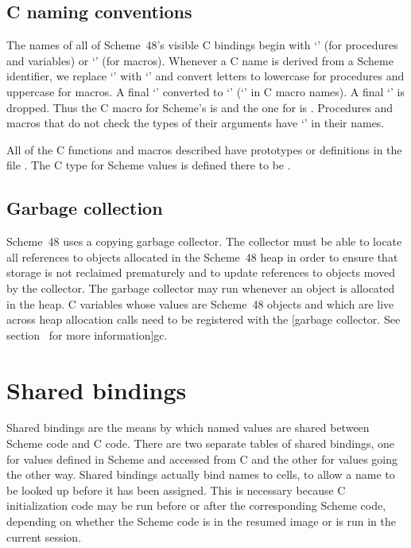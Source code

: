 \subsection{C naming conventions}

The names of all of Scheme~48's visible C bindings begin 
 with `' (for procedures and variables) or 
 `' (for macros).
Whenever a C name is derived from a Scheme identifier, we
 replace `\code{-}' with `\code{\_}' and convert letters to lowercase
 for procedures and uppercase for macros.
A final `'  converted to `' (`' in C macro names).
A final `\code{!}' is dropped.
Thus the C macro for Scheme's  is  and
 the one for  is .
Procedures and macros that do not check the types of their arguments
 have `' in their names.

All of the C functions and macros described have prototypes or definitions
 in the file .
The C type for Scheme values is defined there to be .

\subsection{Garbage collection}

Scheme~48 uses a copying garbage collector.
The collector must be able to locate all references
 to objects allocated in the Scheme~48 heap in order to ensure that
 storage is not reclaimed prematurely and to update references to objects
 moved by the collector.
The garbage collector may run whenever an object is allocated in the heap.
C variables whose values are Scheme~48 objects and which are live across
 heap allocation calls need to be registered with
 the
[garbage collector.  See section~\Ref{} for more information]{gc}.

\section{Shared bindings}
\label{sec:shared-bindings}

Shared bindings are the means by which named values are shared between Scheme
 code and C code.
There are two separate tables of shared bindings, one for values defined in
 Scheme and accessed from C and the other for values going the other way.
Shared bindings actually bind names to cells, to allow a name to be looked
 up before it has been assigned.
This is necessary because C initialization code may be run before or after
 the corresponding Scheme code, depending on whether the Scheme code is in
 the resumed image or is run in the current session.

